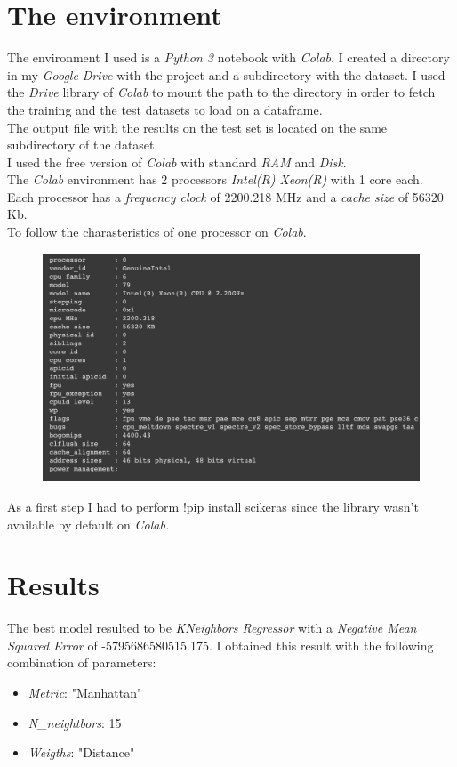 \documentclass[a4paper,10pt]{report}
\begin{document}
\chapter{The environment}
The environment I used is a \emph{Python 3} notebook with \emph{Colab}.
I created a directory in my \emph{Google Drive} with the project and a subdirectory with the dataset.
I used the \emph{Drive} library of \emph{Colab} to mount the path to the directory in order to fetch the training and the test datasets to load on a dataframe.\\
The output file with the results on the test set is located on the same subdirectory of the dataset.\\
I used the free version of \emph{Colab} with standard \emph{RAM} and \emph{Disk}.\\
The \emph{Colab} environment has 2 processors \emph{Intel(R) Xeon(R)} with 1 core each.\\
Each processor has a \emph{frequency clock} of 2200.218 MHz and a \emph{cache size} of 56320 Kb.\\
To follow the charasteristics of one processor on \emph{Colab}.
\begin{figure}[H]
    \centering
    \includegraphics[width = 400pt]{img/procchar.png}
  \end{figure}
As a first step I had to perform {\selectfont !pip install scikeras} since the library wasn't available by default on \emph{Colab.}
\chapter{Results}
The best model resulted to be \emph{KNeighbors Regressor} with a \emph{Negative Mean Squared Error} of -5795686580515.175.
I obtained this result with the following combination of parameters:
\begin{itemize}
\item \emph{Metric}: "Manhattan"
\item \emph{N\_neightbors}: 15
\item \emph{Weigths}: "Distance"
\end{itemize}
\end{document}
